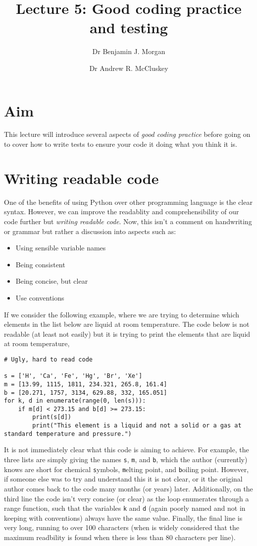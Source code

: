 \documentclass[a4paper]{article}
\title{Lecture 5: Good coding practice and testing}
\author[1]{Dr Benjamin J. Morgan}
\author[1,2]{Dr Andrew R. McCluskey}
\affil[1]{Department of Chemistry, University of Bath, email: b.j.morgan@bath.ac.uk}
\affil[2]{Diamond Light Source, email: andrew.mccluskey@diamond.ac.uk}
\begin{document}
\maketitle

\section*{Aim}
This lecture will introduce several aspects of \emph{good coding practice} before going on to cover how to write tests to ensure your code it doing what you think it is.

\section{Writing readable code}
One of the benefits of using Python over other programming language is the clear syntax.
However, we can improve the readablity and comprehensibility of our code further but \emph{writing readable code}.
Now, this isn't a comment on handwriting or grammar but rather a discussion into aspects such as:
\begin{itemize}
  \item{Using sensible variable names}
  \item{Being consistent}
  \item{Being concise, but clear}
  \item{Use conventions}
\end{itemize}
If we consider the following example, where we are trying to determine which elements in the list below are liquid at room temperature.
The code below is not readable (at least not easily) but it is trying to print the elements that are liquid at room temperature,
\begin{lstlisting}
# Ugly, hard to read code

s = ['H', 'Ca', 'Fe', 'Hg', 'Br', 'Xe']
m = [13.99, 1115, 1811, 234.321, 265.8, 161.4]
b = [20.271, 1757, 3134, 629.88, 332, 165.051]
for k, d in enumerate(range(0, len(s))):
    if m[d] < 273.15 and b[d] >= 273.15:
        print(s[d])
        print("This element is a liquid and not a solid or a gas at standard temperature and pressure.")
\end{lstlisting}
It is not immediately clear what this code is aiming to achieve.
For example, the three lists are simply giving the names \texttt{s}, \texttt{m}, and \texttt{b}, which the author (currently) knows are short for chemical \texttt{s}ymbols, \texttt{m}elting point, and \texttt{b}oiling point.
However, if someone else was to try and understand this it is not clear, or it the original author comes back to the code many months (or years) later.
Additionally, on the third line the code isn't very concise (or clear) as the loop enumerates through a range function, such that the variables \texttt{k} and \texttt{d} (again poorly named and not in keeping with conventions) always have the same value.
Finally, the final line is very long, running to over 100 characters (when is widely considered that the maximum readbility is found when there is less than 80 characters per line).
\end{document}

